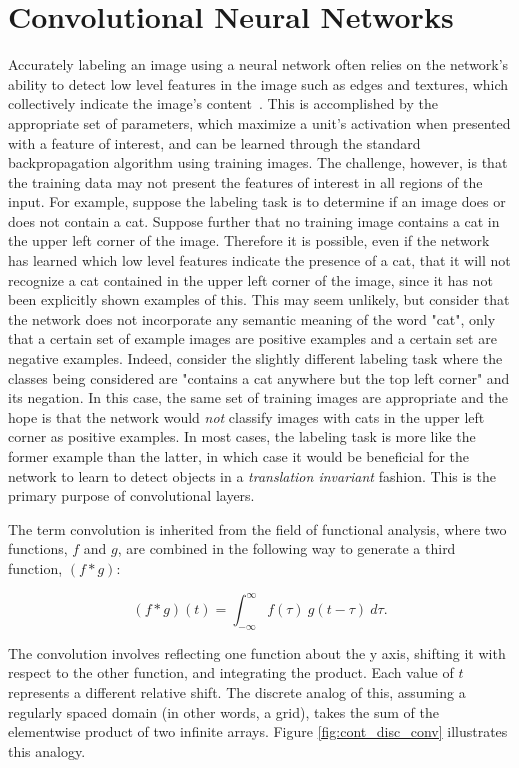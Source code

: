 \section{Convolutional Neural Networks}

Accurately labeling an image using a neural network often relies on the network's ability to detect low level features in the image such as edges and textures, which collectively indicate the image's content~\cite{ng2011}.
This is accomplished by the appropriate set of parameters, which maximize a unit's activation when presented with a feature of interest, and can be learned through the standard backpropagation algorithm using training images. 
The challenge, however, is that the training data may not present the features of interest in all regions of the input. 
For example, suppose the labeling task is to determine if an image does or does not contain a cat.
Suppose further that no training image contains a cat in the upper left corner of the image.
Therefore it is possible, even if the network has learned which low level features indicate the presence of a cat, that it will not recognize a cat contained in the upper left corner of the image, since it has not been explicitly shown examples of this.
This may seem unlikely, but consider that the network does not incorporate any semantic meaning of the word "cat", only that a certain set of example images are positive examples and a certain set are negative examples.
Indeed, consider the slightly different labeling task where the classes being considered are "contains a cat anywhere but the top left corner" and its negation.
In this case, the same set of training images are appropriate and the hope is that the network would \textit{not} classify images with cats in the upper left corner as positive examples.
In most cases, the labeling task is more like the former example than the latter, in which case it would be beneficial for the network to learn to detect objects in a \textit{translation invariant} fashion. 
This is the primary purpose of convolutional layers.

The term convolution is inherited from the field of functional analysis, where two functions, $f$ and $g$, are combined in the following way to generate a third function, $(f*g)$:

\begin{equation}
(f*g)(t) = \int_{-\infty}^{\infty}f(\tau)~g(t-\tau)~d\tau.
\label{eq:math_conv}
\end{equation}

\noindent
The convolution involves reflecting one function about the y axis, shifting it with respect to the other function, and integrating the product. 
Each value of $t$ represents a different relative shift.
The discrete analog of this, assuming a regularly spaced domain (in other words, a grid), takes the sum of the elementwise product of two infinite arrays.
Figure \ref{fig:cont_disc_conv} illustrates this analogy.

